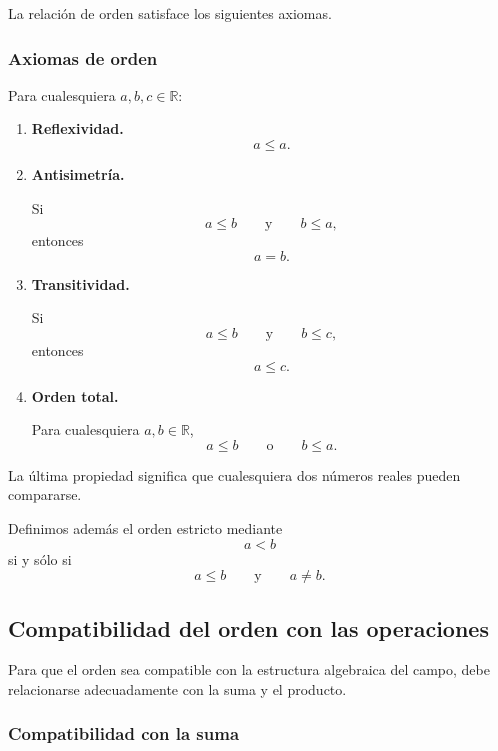 \documentclass[12pt]{article}
\theoremstyle{plain}
\theoremstyle{definition}
\theoremstyle{remark}
\begin{document}
La relación de orden satisface los siguientes axiomas.

\subsubsection*{Axiomas de orden}

Para cualesquiera $a,b,c\in\mathbb{R}$:

\begin{enumerate}[label=\textbf{O\arabic*.}]

    \item \textbf{Reflexividad.}
    \[
    a\leq a.
    \]

    \item \textbf{Antisimetría.}

    Si
    \[
    a\leq b
    \qquad\text{y}\qquad
    b\leq a,
    \]
    entonces
    \[
    a=b.
    \]

    \item \textbf{Transitividad.}

    Si
    \[
    a\leq b
    \qquad\text{y}\qquad
    b\leq c,
    \]
    entonces
    \[
    a\leq c.
    \]

    \item \textbf{Orden total.}

    Para cualesquiera $a,b\in\mathbb{R}$,
    \[
    a\leq b
    \qquad\text{o}\qquad
    b\leq a.
    \]

\end{enumerate}

La última propiedad significa que cualesquiera dos números reales pueden
compararse.

Definimos además el orden estricto mediante
\[
a<b
\]
si y sólo si
\[
a\leq b
\qquad\text{y}\qquad
a\neq b.
\]

\subsection*{Compatibilidad del orden con las operaciones}

Para que el orden sea compatible con la estructura algebraica del campo,
debe relacionarse adecuadamente con la suma y el producto.

\subsubsection*{Compatibilidad con la suma}
\end{document}
